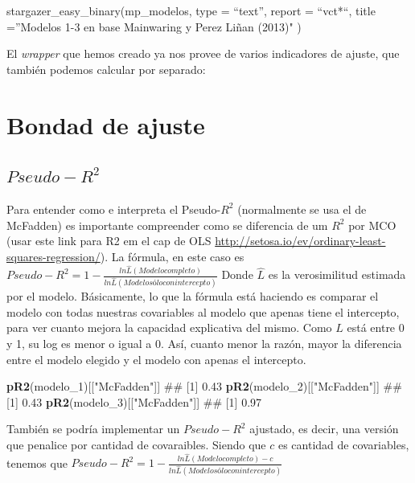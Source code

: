 \documentclass[]{book}
\newenvironment{Shaded}{\begin{snugshade}}{\end{snugshade}}
\newcommand{\KeywordTok}[1]{\textcolor[rgb]{0.13,0.29,0.53}{\textbf{#1}}}
\newcommand{\DecValTok}[1]{\textcolor[rgb]{0.00,0.00,0.81}{#1}}
\newcommand{\StringTok}[1]{\textcolor[rgb]{0.31,0.60,0.02}{#1}}
\newcommand{\NormalTok}[1]{#1}
\begin{document}
stargazer\_easy\_binary(mp\_modelos, type = ``text'', report = ``vct*``,
title =''Modelos 1-3 en base Mainwaring y Perez Liñan (2013)" )

El \emph{wrapper} que hemos creado ya nos provee de varios indicadores
de ajuste, que también podemos calcular por separado:

\section{Bondad de ajuste}\label{bondad-de-ajuste}

\subsection{\texorpdfstring{\(Pseudo-R^2\)}{Pseudo-R\^{}2}}\label{pseudo-r2}

Para entender como e interpreta el Pseudo-\(R^2\) (normalmente se usa el
de McFadden) es importante compreender como se diferencia de um \(R^2\)
por MCO (usar este link para R2 em el cap de OLS
\url{http://setosa.io/ev/ordinary-least-squares-regression/}). La
fórmula, en este caso es
\(Pseudo-R^2= 1-\frac {ln \hat{L}(Modelo completo)}{ln \hat{L}(Modelo sólo con intercepto)}\)
Donde \(\hat{L}\) es la verosimilitud estimada por el modelo.
Básicamente, lo que la fórmula está haciendo es comparar el modelo con
todas nuestras covariables al modelo que apenas tiene el intercepto,
para ver cuanto mejora la capacidad explicativa del mismo. Como \(L\)
está entre 0 y 1, su log es menor o igual a 0. Así, cuanto menor la
razón, mayor la diferencia entre el modelo elegido y el modelo con
apenas el intercepto.

\begin{Shaded}
\begin{Highlighting}[]
\KeywordTok{pR2}\NormalTok{(modelo_}\DecValTok{1}\NormalTok{)[[}\StringTok{"McFadden"}\NormalTok{]]}
\NormalTok{## [1] 0.43}
\KeywordTok{pR2}\NormalTok{(modelo_}\DecValTok{2}\NormalTok{)[[}\StringTok{"McFadden"}\NormalTok{]]}
\NormalTok{## [1] 0.43}
\KeywordTok{pR2}\NormalTok{(modelo_}\DecValTok{3}\NormalTok{)[[}\StringTok{"McFadden"}\NormalTok{]]}
\NormalTok{## [1] 0.97}
\end{Highlighting}
\end{Shaded}

También se podría implementar un \(Pseudo-R^2\) ajustado, es decir, una
versión que penalice por cantidad de covaraibles. Siendo que \(c\) es
cantidad de covariables, tenemos que
\(Pseudo-R^2= 1-\frac {ln \hat{L}(Modelo completo)-c}{ln \hat{L}(Modelo sólo con intercepto)}\)
\end{document}
